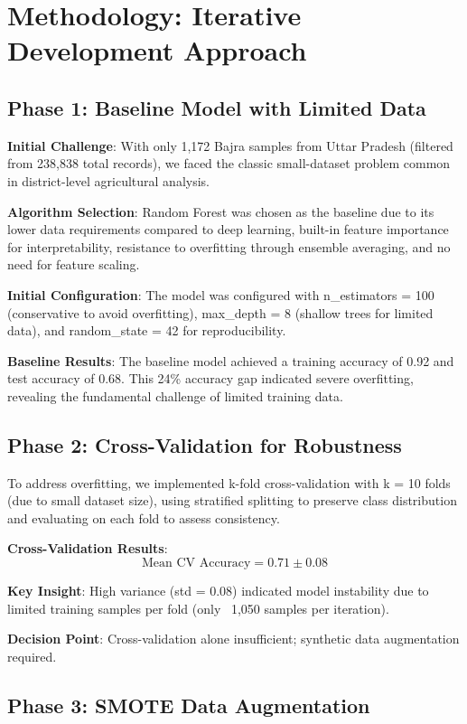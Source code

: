 \documentclass[10pt,twocolumn]{article}
\begin{document}
\section{Methodology: Iterative Development Approach}

\subsection{Phase 1: Baseline Model with Limited Data}

\textbf{Initial Challenge}: With only 1,172 Bajra samples from Uttar Pradesh (filtered from 238,838 total records), we faced the classic small-dataset problem common in district-level agricultural analysis.

\textbf{Algorithm Selection}: Random Forest was chosen as the baseline due to its lower data requirements compared to deep learning, built-in feature importance for interpretability, resistance to overfitting through ensemble averaging, and no need for feature scaling.

\textbf{Initial Configuration}: The model was configured with n\_estimators = 100 (conservative to avoid overfitting), max\_depth = 8 (shallow trees for limited data), and random\_state = 42 for reproducibility.

\textbf{Baseline Results}: The baseline model achieved a training accuracy of 0.92 and test accuracy of 0.68. This 24\% accuracy gap indicated severe overfitting, revealing the fundamental challenge of limited training data.

\subsection{Phase 2: Cross-Validation for Robustness}

To address overfitting, we implemented k-fold cross-validation with k = 10 folds (due to small dataset size), using stratified splitting to preserve class distribution and evaluating on each fold to assess consistency.

\textbf{Cross-Validation Results}:
\[
\text{Mean CV Accuracy} = 0.71 \pm 0.08
\]

\textbf{Key Insight}: High variance (std = 0.08) indicated model instability due to limited training samples per fold (only ~1,050 samples per iteration).

\textbf{Decision Point}: Cross-validation alone insufficient; synthetic data augmentation required.

\subsection{Phase 3: SMOTE Data Augmentation}
\end{document}
